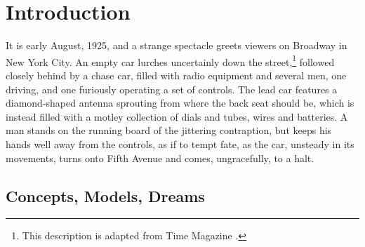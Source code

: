 \chapter{Introduction}
\label{chap:0}



It is early August, 1925, and a strange spectacle greets viewers on
Broadway in New York City. An empty car lurches uncertainly down the
street,\footnote{This description is adapted from Time
  Magazine \cite{ScienceRadio}.} followed closely behind by a
chase car, filled with radio equipment and several men, one driving,
and one furiously operating a set of controls. The lead car features a
diamond-shaped antenna sprouting from where the back seat should be,
which is instead filled with a motley collection of dials and tubes,
wires and batteries. A man stands on the running board of the
jittering contraption, but keeps his
hands well away from the controls, as if to tempt fate, as the car,
unsteady in its movements, turns onto Fifth Avenue and comes,
ungracefully, to a halt.

\section{Concepts, Models, Dreams}

